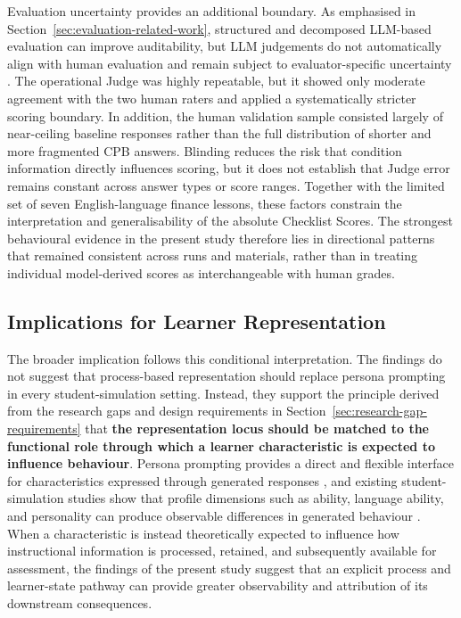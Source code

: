 Evaluation uncertainty provides an additional boundary. As emphasised in Section~\ref{sec:evaluation-related-work}, structured and decomposed LLM-based evaluation can improve auditability, but LLM judgements do not automatically align with human evaluation and remain subject to evaluator-specific uncertainty \cite{hashemi-etal-2024-llm,lee-etal-2025-checkeval}. The operational Judge was highly repeatable, but it showed only moderate agreement with the two human raters and applied a systematically stricter scoring boundary. In addition, the human validation sample consisted largely of near-ceiling baseline responses rather than the full distribution of shorter and more fragmented CPB answers. Blinding reduces the risk that condition information directly influences scoring, but it does not establish that Judge error remains constant across answer types or score ranges. Together with the limited set of seven English-language finance lessons, these factors constrain the interpretation and generalisability of the absolute Checklist Scores. The strongest behavioural evidence in the present study therefore lies in directional patterns that remained consistent across runs and materials, rather than in treating individual model-derived scores as interchangeable with human grades.

\subsection{Implications for Learner Representation}

The broader implication follows this conditional interpretation. The findings do not suggest that process-based representation should replace persona prompting in every student-simulation setting. Instead, they support the principle derived from the research gaps and design requirements in Section~\ref{sec:research-gap-requirements} that \textbf{the representation locus should be matched to the functional role through which a learner characteristic is expected to influence behaviour}. Persona prompting provides a direct and flexible interface for characteristics expressed through generated responses \cite{tseng-etal-2024-two,wang-etal-2024-rolellm}, and existing student-simulation studies show that profile dimensions such as ability, language ability, and personality can produce observable differences in generated behaviour \cite{benedetto-etal-2024-using,liu-etal-2024-personality}. When a characteristic is instead theoretically expected to influence how instructional information is processed, retained, and subsequently available for assessment, the findings of the present study suggest that an explicit process and learner-state pathway can provide greater observability and attribution of its downstream consequences.

